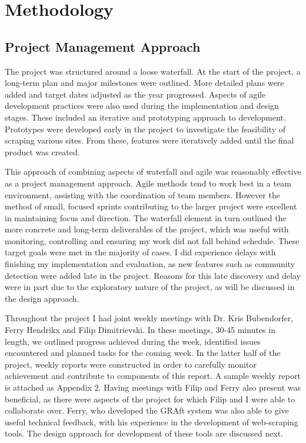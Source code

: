 \chapter{Methodology}\label{C:us}

\section{Project Management Approach}



The project was structured around a loose waterfall. At the start of the project, a long-term plan and major milestones were outlined. More detailed plans were added and target dates adjusted as the year progressed. Aspects of agile development practices were also used during the implementation and design stages. These included an iterative and prototyping approach to development. Prototypes were developed early in the project to investigate the feasibility of scraping various sites. From these, features were iteratively added until the final product was created.

This approach of combining aspects of waterfall and agile was reasonably effective as a project management approach. Agile methods tend to work best in a team environment, assisting with the coordination of team members. However the method of small, focused sprints contributing to the larger project were excellent in maintaining focus and direction. The waterfall element in turn outlined the more concrete and long-term deliverables of the project, which was useful with monitoring, controlling and ensuring my work did not fall behind schedule. These target goals were met in the majority of cases. I did experience delays with finishing my implementation and evaluation, as new features such as community detection were added late in the project. Reasons for this late discovery and delay were in part due to the exploratory nature of the project, as will be discussed in the design approach.

Throughout the project I had joint weekly meetings with Dr. Kris Bubendorfer,  Ferry Hendrikx and Filip Dimitrievski. In these meetings, 30-45 minutes in length, we outlined progress achieved during the week, identified issues encountered and planned tasks for the coming week. In the latter half of the project, weekly reports were constructed in order to carefully monitor achievement and contribute to components of this report. A sample weekly report is attached as Appendix 2. Having meetings with Filip and Ferry also present was beneficial, as there were aspects of the project for which Filip and I were able to collaborate over. Ferry, who developed the GRAft system was also able to give useful technical feedback, with his experience in the development of web-scraping tools. The design approach for development of these tools are discussed next.

